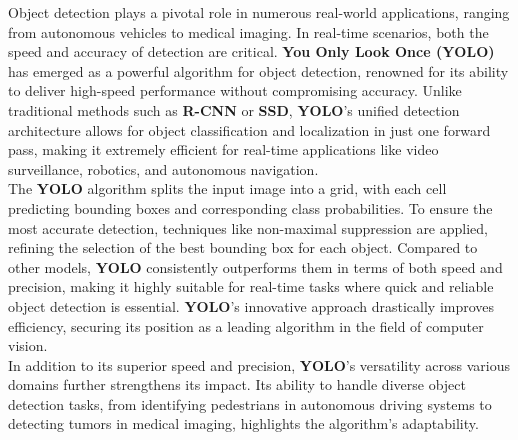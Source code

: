 %
%
%
Object detection plays a pivotal role in numerous real-world applications, ranging from autonomous vehicles to medical imaging. In real-time scenarios, both the speed and accuracy of detection are critical. \textbf{You Only Look Once (YOLO)} has emerged as a powerful algorithm for object detection, renowned for its ability to deliver high-speed performance without compromising accuracy. 
%
Unlike traditional methods such as \textbf{R-CNN} or \textbf{SSD}, \textbf{YOLO}’s unified detection architecture allows for object classification and localization in just one forward pass, making it extremely efficient for real-time applications like video surveillance, robotics, and autonomous navigation.\\[0.5cm]
%
The \textbf{YOLO} algorithm splits the input image into a grid, with each cell predicting bounding boxes and corresponding class probabilities.  To ensure the most accurate detection, techniques like non-maximal suppression are applied, refining the selection of the best bounding box for each object. Compared to other models, \textbf{YOLO} consistently outperforms them in terms of both speed and precision, making it highly suitable for real-time tasks where quick and reliable object detection is essential. \textbf{YOLO}'s innovative approach drastically improves efficiency, securing its position as a leading algorithm in the field of computer vision.\\[0.5cm]
%
In addition to its superior speed and precision, \textbf{YOLO}'s versatility across various domains further strengthens its impact. Its ability to handle diverse object detection tasks, from identifying pedestrians in autonomous driving systems to detecting tumors in medical imaging, highlights the algorithm’s adaptability. 
